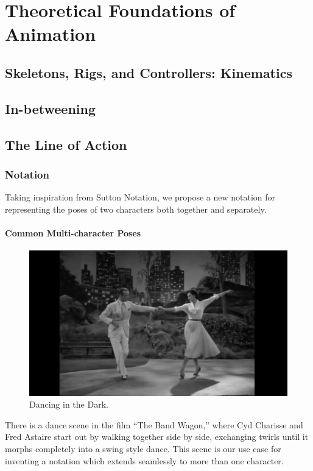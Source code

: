 \chapter{Theoretical Foundations of Animation}\label{chap:theory}

\section{Skeletons, Rigs, and Controllers: Kinematics}


\section{In-betweening}


\section{The Line of Action}
\subsection{Notation}
Taking inspiration from Sutton Notation, we propose a new notation for representing the poses of two characters both together and separately.

\subsubsection{Common Multi-character Poses}
\begin{figure}
\centering
\includegraphics[scale=0.1]{img/bandwagon}
\caption{Dancing in the Dark.}
\end{figure}

There is a dance scene in the film ``The Band Wagon,'' where Cyd Charisse and Fred Astaire start out by walking together side by side, exchanging twirls until it morphs completely into a swing style dance. This scene is our use case for inventing a notation which extends seamlessly to more than one character.

